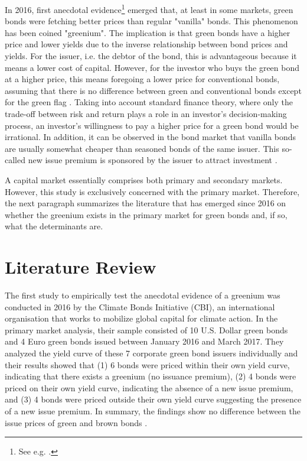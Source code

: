 In 2016, first anecdotal evidence\footnote{See e.g. \citet{barclays}.} emerged that, at least in some markets, green bonds were fetching better prices than regular "vanilla" bonds. This phenomenon has been coined "greenium". The implication is that green bonds have a higher price and lower yields due to the inverse relationship between bond prices and yields. For the issuer, i.e. the debtor of the bond, this is advantageous because it means a lower cost of capital. However, for the investor who buys the green bond at a higher price, this means foregoing a lower price for conventional bonds, assuming that there is no difference between green and conventional bonds except for the green flag \citep[p. 19]{cbi2016}. Taking into account standard finance theory, where only the trade-off between risk and return plays a role in an investor's decision-making process, an investor's willingness to pay a higher price for a green bond would be irrational. In addition, it can be observed in the bond market that vanilla bonds are usually somewhat cheaper than seasoned bonds of the same issuer. This so-called new issue premium is sponsored by the issuer to attract investment \citep[p. 10]{cbi2017}. 

A capital market essentially comprises both primary and secondary markets. However, this study is exclusively concerned with the primary market. Therefore, the next paragraph summarizes the literature that has emerged since 2016 on whether the greenium exists in the primary market for green bonds and, if so, what the determinants are.

\section{Literature Review}

The first study to empirically test the anecdotal evidence of a greenium was conducted in 2016 by the Climate Bonds Initiative (CBI), an international organisation that works to mobilize global capital for climate action. In the primary market analysis, their sample consisted of 10 U.S. Dollar green bonds and 4 Euro green bonds issued between January 2016 and March 2017. They analyzed the yield curve of these 7 corporate green bond issuers individually and their results showed that (1) 6 bonds were priced within their own yield curve, indicating that there exists a greenium (no issuance premium), (2) 4 bonds were priced on their own yield curve, indicating the absence of a new issue premium, and (3) 4 bonds were priced outside their own yield curve suggesting the presence of a new issue premium. In summary, the findings show no difference between the issue prices of green and brown bonds \citep[p. 10]{cbi2017}.

